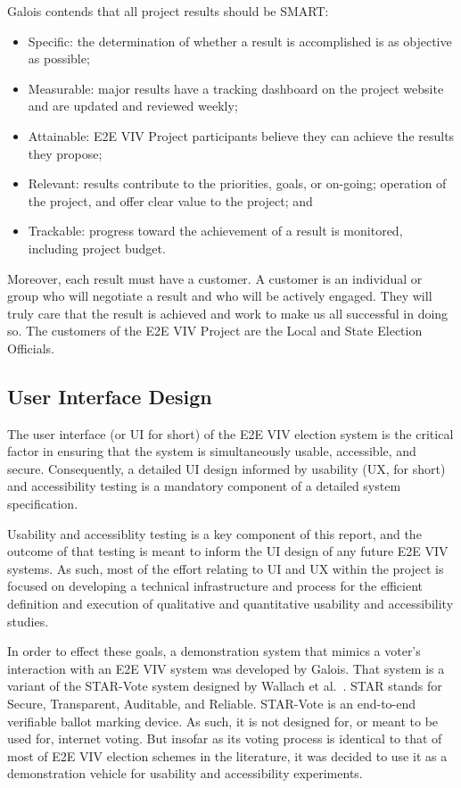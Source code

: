 Galois contends that all project results should be SMART: 
\begin{itemize}
\item Specific: the determination of whether a result is accomplished
  is as objective as possible; 
\item Measurable: major results have a tracking dashboard on the
  project website and are updated and reviewed weekly; 
\item Attainable: E2E VIV Project participants believe they can
  achieve the results they propose; 
\item Relevant: results contribute to the priorities, goals, or
  on-going; operation of the project, and offer clear value to the
  project; and 
\item Trackable: progress toward the achievement of a result is
  monitored, including project budget. 
\end{itemize}

Moreover, each result must have a customer. A customer is an
individual or group who will negotiate a result and who will be
actively engaged. They will truly care that the result is achieved and
work to make us all successful in doing so. The customers of the E2E
VIV Project are the Local and State Election Officials. 

\subsection{User Interface Design}
\label{sec:user-interf-design}

The user interface (or UI for short) of the E2E VIV election system is
the critical factor in ensuring that the system is simultaneously
usable, accessible, and secure.  Consequently, a detailed UI design
informed by usability (UX, for short) and accessibility testing is a
mandatory component of a detailed system specification.

Usability and accessiblity testing is a key component of this report,
and the outcome of that testing is meant to inform the UI design of
any future E2E VIV systems.  As such, most of the effort relating to
UI and UX within the project is focused on developing a technical
infrastructure and process for the efficient definition and execution
of qualitative and quantitative usability and accessibility studies.

In order to effect these goals, a demonstration system that mimics a
voter's interaction with an E2E VIV system was developed by Galois.
That system is a variant of the STAR-Vote system designed by Wallach
et al.~\cite{}.  STAR stands for Secure, Transparent, Auditable, and
Reliable.  STAR-Vote is an end-to-end verifiable ballot marking
device.  As such, it is not designed for, or meant to be used for,
internet voting.  But insofar as its voting process is identical to
that of most of E2E VIV election schemes in the literature, it was
decided to use it as a demonstration vehicle for usability and
accessibility experiments.

